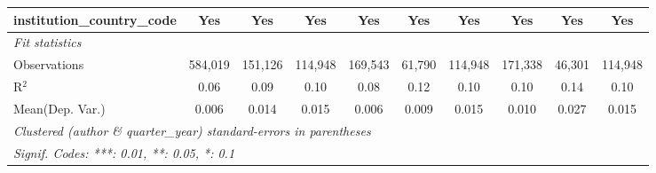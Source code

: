 \begin{tabular}{lccccccccc}
   institution\_country\_code             & Yes          & Yes           & Yes           & Yes          & Yes          & Yes           & Yes          & Yes           & Yes\\  
   \midrule
   \emph{Fit statistics}\\
   Observations                           & 584,019      & 151,126       & 114,948       & 169,543      & 61,790       & 114,948       & 171,338      & 46,301        & 114,948\\  
   R$^2$                                  & 0.06         & 0.09          & 0.10          & 0.08         & 0.12         & 0.10          & 0.10         & 0.14          & 0.10\\  
Mean(Dep. Var.) & 0.006 & 0.014 & 0.015 & 0.006 & 0.009 & 0.015 & 0.010 & 0.027 & 0.015 \\
   \midrule \midrule
   \multicolumn{10}{l}{\emph{Clustered (author \& quarter\_year) standard-errors in parentheses}}\\
   \multicolumn{10}{l}{\emph{Signif. Codes: ***: 0.01, **: 0.05, *: 0.1}}\\
\end{tabular}
\par\endgroup

